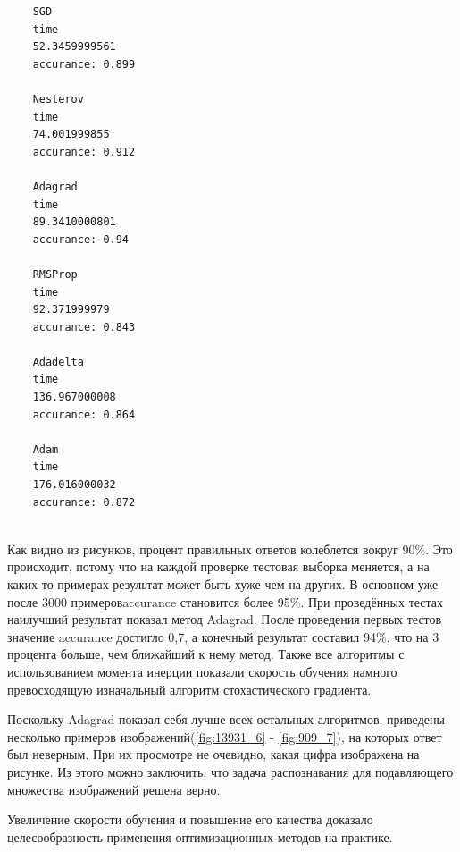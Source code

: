 \documentclass[oneside,final,14pt]{extreport}
\begin{document}
\begin{lstlisting}
    SGD
    time
    52.3459999561
    accurance: 0.899
    
    Nesterov
    time
    74.001999855
    accurance: 0.912
    
    Adagrad
    time
    89.3410000801
    accurance: 0.94
    
    RMSProp
    time
    92.371999979
    accurance: 0.843
    
    Adadelta
    time
    136.967000008
    accurance: 0.864
    
    Adam
    time
    176.016000032
    accurance: 0.872
\end{lstlisting}
\\
Как видно из рисунков, процент правильных ответов колеблется вокруг 90\%. Это происходит, потому что на каждой проверке тестовая выборка меняется, а на каких-то примерах результат может быть хуже чем на других. В основном уже после 3000 примеров\ttfamily accurance \normalfont становится более 95\%. При проведённых тестах наилучший результат показал метод \ttfamily Adagrad\normalfont. После проведения первых тестов значение \ttfamily accurance \normalfont достигло 0,7, а конечный результат составил 94\%, что на 3 процента больше, чем ближайший к нему метод. Также все алгоритмы с использованием момента инерции показали скорость обучения намного превосходящую изначальный алгоритм стохастического градиента.

Поскольку Adagrad показал себя лучше всех остальных алгоритмов, приведены несколько примеров изображений(\ref{fig:13931_6} - \ref{fig:909_7}), на которых ответ был неверным. При их просмотре не очевидно, какая цифра изображена на рисунке. Из этого можно заключить, что задача распознавания для подавляющего множества изображений решена верно. 

Увеличение скорости обучения и повышение его качества доказало целесообразность применения оптимизационных методов на практике.
\end{document}
